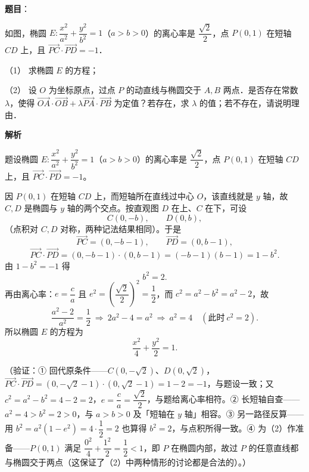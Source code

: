 \begin{answer}

\textbf{题目}：

如图，椭圆 \(E:\dfrac{x^2}{a^2}+\dfrac{y^2}{b^2}=1\)（\(a>b>0\)）的离心率是 \(\dfrac{\sqrt{2}}{2}\)，点 \(P(0,1)\) 在短轴 \(CD\) 上，且 \(\overrightarrow{PC}\cdot\overrightarrow{PD}=-1\)．
\nopagebreak[4]
\begin{center}\end{center}
\nopagebreak[4]
（1） 求椭圆 \(E\) 的方程；

（2） 设 \(O\) 为坐标原点，过点 \(P\) 的动直线与椭圆交于 \(A,B\) 两点．是否存在常数 \(\lambda\)，使得 \(\overrightarrow{OA}\cdot\overrightarrow{OB}+\lambda\overrightarrow{PA}\cdot\overrightarrow{PB}\) 为定值？若存在，求 \(\lambda\) 的值；若不存在，请说明理由．

\textbf{解析}

题设椭圆 \(E:\dfrac{x^{2}}{a^{2}}+\dfrac{y^{2}}{b^{2}}=1\)（\(a>b>0\)）的离心率是 \(\dfrac{\sqrt{2}}{2}\)，点 \(P(0,1)\) 在短轴 \(CD\) 上，且 \(\overrightarrow{PC}\cdot\overrightarrow{PD}=-1\)。


因 \(P(0,1)\) 在短轴 \(CD\) 上，而短轴所在直线过中心 \(O\)，该直线就是 \(y\) 轴，故 \(C,D\) 是椭圆与 \(y\) 轴的两个交点。按直观图 \(D\) 在上、\(C\) 在下，可设
\nopagebreak[4]
\[
C(0,-b),\qquad D(0,b),
\]
（点积对 \(C,D\) 对称，两种记法结果相同）。于是
\nopagebreak[4]
\[
\overrightarrow{PC}=(0,-b-1),\qquad \overrightarrow{PD}=(0,b-1),
\]
\nopagebreak[4]
\[
\overrightarrow{PC}\cdot\overrightarrow{PD}=(0,-b-1)\cdot(0,b-1)=(-b-1)(b-1)=1-b^{2}.
\]
由 \(1-b^{2}=-1\) 得
\nopagebreak[4]
\[
b^{2}=2 .
\]
再由离心率：\(e=\dfrac{c}{a}\) 且 \(e^{2}=\left(\dfrac{\sqrt{2}}{2}\right)^{2}=\dfrac{1}{2}\)，而 \(c^{2}=a^{2}-b^{2}=a^{2}-2\)，故
\nopagebreak[4]
\[
\frac{a^{2}-2}{a^{2}}=\frac{1}{2}\ \Longrightarrow\ 2a^{2}-4=a^{2}\ \Longrightarrow\ a^{2}=4\quad(\text{此时}\ c^{2}=2).
\]
所以椭圆 \(E\) 的方程为
\nopagebreak[4]
\[
\frac{x^{2}}{4}+\frac{y^{2}}{2}=1 .
\]

（验证：① 回代原条件——\(C(0,-\sqrt{2})\)、\(D(0,\sqrt{2})\)，\(\overrightarrow{PC}\cdot\overrightarrow{PD}=(0,-\sqrt{2}-1)\cdot(0,\sqrt{2}-1)=1-2=-1\)，与题设一致；又 \(c^{2}=a^{2}-b^{2}=4-2=2\)，\(e=\dfrac{c}{a}=\dfrac{\sqrt{2}}{2}\)，与题给离心率相符。② 长短轴自查——\(a^{2}=4>b^{2}=2>0\)，与 \(a>b>0\) 及「短轴在 \(y\) 轴」相容。③ 另一路径反算——用 \(b^{2}=a^{2}(1-e^{2})=4\cdot\dfrac{1}{2}=2\) 也算得 \(b^{2}=2\)，与点积所得一致。④ 为（2）作准备——\(P(0,1)\) 满足 \(\dfrac{0^{2}}{4}+\dfrac{1^{2}}{2}=\dfrac{1}{2}<1\)，即 \(P\) 在椭圆内部，故过 \(P\) 的任意直线都与椭圆交于两点（这保证了（2）中两种情形的讨论都是合法的）。）


\end{answer}
